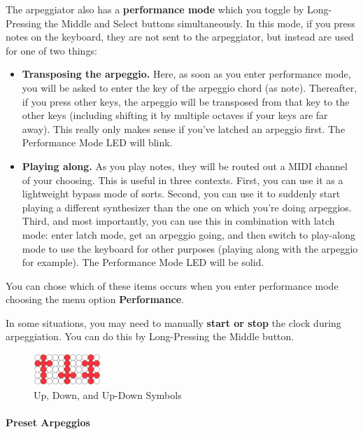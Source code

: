 \documentclass{article}
\begin{document}
The arpeggiator also has a {\bf performance mode} which you toggle by Long-Pressing the Middle and Select buttons simultaneously.  In this mode, if you press notes on the keyboard, they are not sent to the arpeggiator, but instead are used for one of two things:
	\begin{itemize}
	\item {\bf Transposing the arpeggio.}  Here, as soon as you enter performance mode, you will be asked to enter the key of the arpeggio chord (as note).  Thereafter, if you press other keys, the arpeggio will be transposed from that key to the other keys (including shifting it by multiple octaves if your keys are far away).  This really only makes sense if you've latched an arpeggio first.  The Performance Mode LED will blink.
	\item {\bf Playing along.}  As you play notes, they will be routed out a MIDI channel of your choosing.  This is useful in three contexts.  First, you can use it as a lightweight bypass mode of sorts.  Second, you can use it to suddenly start playing a different synthesizer than the one on which you're doing arpeggios.   Third, and most importantly, you can use this in combination with latch mode: enter latch mode, get an arpeggio going, and then switch to play-along mode to use the keyboard for other purposes (playing along with the arpeggio for example).  The Performance Mode LED will be solid.
	\end{itemize}
You can chose which of these items occurs when you enter performance mode choosing the menu option {\bf Performance}.

In some situations, you may need to manually {\bf start or stop} the clock during arpeggiation.  You can do this by Long-Pressing the Middle button.


\begin{figure}
\begin{center}
\vspace{-4em}\includegraphics[width=1in]{updown}
\vspace{-1em}
\caption{\small Up, Down, and Up-Down Symbols}
\vspace{-4em}
\end{center}
\end{figure}

\paragraph{Preset Arpeggios}
\end{document}
